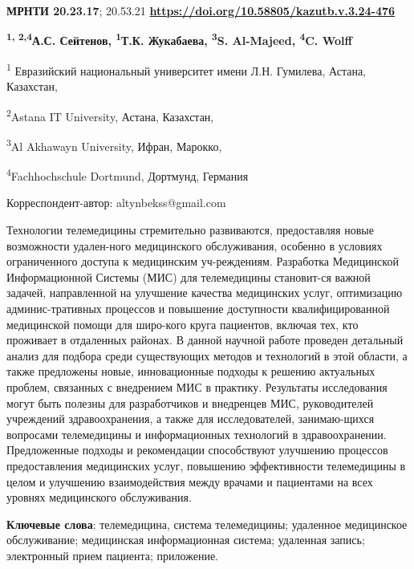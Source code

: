 \newpage
{\bfseries МРНТИ 20.23.17}; 20.53.21
\hfill {\bfseries \href{https://doi.org/10.58805/kazutb.v.3.24-476}{https://doi.org/10.58805/kazutb.v.3.24-476}}


\begin{center}

{\bfseries \textsuperscript{1, 2,4}А.С. Сейтенов\envelope,
\textsuperscript{1}Т.К. Жукабаева, \textsuperscript{3}S. Al-Majeed,
\textsuperscript{4}C. Wolff}

\textsuperscript{1} Евразийский национальный университет имени Л.Н.
Гумилева, Астана, Казахстан,

\textsuperscript{2}Astana IT University, Астана, Казахстан,

\textsuperscript{3}Al Akhawayn University, Ифран, Марокко,

\textsuperscript{4}Fachhochschule Dortmund, Дортмунд, Германия
\end{center}
\envelope Корреспондент-автор: altynbekss@gmail.com \vspace{0.5cm}

Технологии телемедицины стремительно развиваются, предоставляя новые
возможности удален-ного медицинского обслуживания, особенно в условиях
ограниченного доступа к медицинским уч-реждениям. Разработка Медицинской
Информационной Системы (МИС) для телемедицины становит-ся важной задачей,
направленной на улучшение качества медицинских услуг, оптимизацию
админис-тративных процессов и повышение доступности квалифицированной
медицинской помощи для широ-кого круга пациентов, включая тех, кто
проживает в отдаленных районах. В данной научной работе проведен
детальный анализ для подбора среди существующих методов и технологий в
этой области, а также предложены новые, инновационные подходы к решению
актуальных проблем, связанных с внедрением МИС в практику. Результаты
исследования могут быть полезны для разработчиков и внедренцев МИС,
руководителей учреждений здравоохранения, а также для исследователей,
занимаю-щихся вопросами телемедицины и информационных технологий в
здравоохранении. Предложенные подходы и рекомендации способствуют
улучшению процессов предоставления медицинских услуг, повышению
эффективности телемедицины в целом и улучшению взаимодействия между
врачами и пациентами на всех уровнях медицинского обслуживания.

{\bfseries Ключевые слова}: телемедицина, система телемедицины; удаленное
медицинское обслуживание; медицинская информационная система; удаленная
запись; электронный прием пациента; приложение.


